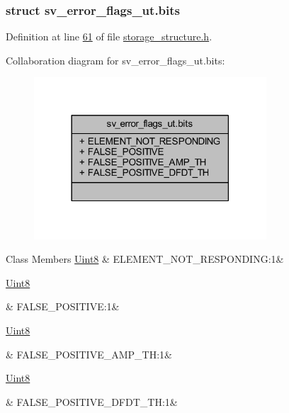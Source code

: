 \subsubsection{struct sv\+\_\+error\+\_\+flags\+\_\+ut.\+bits}


Definition at line \hyperlink{a00003_source_l00061}{61} of file \hyperlink{a00003_source}{storage\+\_\+structure.\+h}.



Collaboration diagram for sv\+\_\+error\+\_\+flags\+\_\+ut.\+bits\+:
\nopagebreak
\begin{figure}[H]
\begin{center}
\leavevmode
\includegraphics[width=246pt]{d0/d24/a00222}
\end{center}
\end{figure}
\begin{DoxyFields}{Class Members}
\hypertarget{a00003_a587be3dd1f4afa15f556d70085096e86}{\hyperlink{a00001_a979e3e23b9a449e69ab6a8a83b6042f8}{Uint8}}\label{a00003_a587be3dd1f4afa15f556d70085096e86}
&
E\+L\+E\+M\+E\+N\+T\+\_\+\+N\+O\+T\+\_\+\+R\+E\+S\+P\+O\+N\+D\+I\+N\+G\+:1&
\\
\hline

\hypertarget{a00003_a19777be47fcaa9d570e4fe573d533583}{\hyperlink{a00001_a979e3e23b9a449e69ab6a8a83b6042f8}{Uint8}}\label{a00003_a19777be47fcaa9d570e4fe573d533583}
&
F\+A\+L\+S\+E\+\_\+\+P\+O\+S\+I\+T\+I\+V\+E\+:1&
\\
\hline

\hypertarget{a00003_a4f8d459be1a156962f3fec7d025c7c98}{\hyperlink{a00001_a979e3e23b9a449e69ab6a8a83b6042f8}{Uint8}}\label{a00003_a4f8d459be1a156962f3fec7d025c7c98}
&
F\+A\+L\+S\+E\+\_\+\+P\+O\+S\+I\+T\+I\+V\+E\+\_\+\+A\+M\+P\+\_\+\+T\+H\+:1&
\\
\hline

\hypertarget{a00003_a0c1a4805544c234baaaca401b6bba48a}{\hyperlink{a00001_a979e3e23b9a449e69ab6a8a83b6042f8}{Uint8}}\label{a00003_a0c1a4805544c234baaaca401b6bba48a}
&
F\+A\+L\+S\+E\+\_\+\+P\+O\+S\+I\+T\+I\+V\+E\+\_\+\+D\+F\+D\+T\+\_\+\+T\+H\+:1&
\\
\hline

\end{DoxyFields}
\label{d0/d5e/a00136}
\hypertarget{a00003_d0/d5e/a00136}{}
